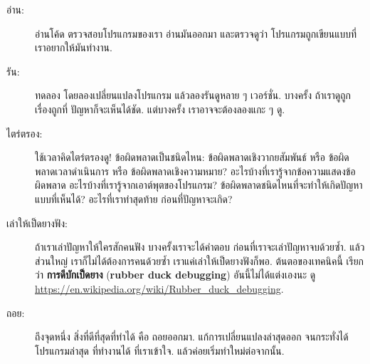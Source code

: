 \begin{description}


\item[อ่าน:] อ่านโค้ด ตรวจสอบโปรแกรมของเรา อ่านมันออกมา
และตรวจดูว่า โปรแกรมถูกเขียนแบบที่เราอยากให้มันทำงาน.


\item[รัน:]
ทดลอง โดยลองเปลี่ยนแปลงโปรแกรม แล้วลองรันดูหลาย ๆ เวอร์ชั่น.
บางครั้ง ถ้าเราดูถูกเรื่องถูกที่ ปัญหาก็จะเห็นได้ชัด.
แต่บางครั้ง เราอาจจะต้องลองแกะ ๆ ดู.


\item[ไตร่ตรอง:] ใช้เวลาคิดไตร่ตรองดู! ข้อผิดพลาดเป็นชนิดไหน: ข้อผิดพลาดเชิงวากยสัมพันธ์
หรือ ข้อผิดพลาดเวลาดำเนินการ
หรือ ข้อผิดพลาดเชิงความหมาย?
อะไรบ้างที่เรารู้จากข้อความแสดงข้อผิดพลาด
อะไรบ้างที่เรารู้จากเอาต์พุตของโปรแกรม?
ข้อผิดพลาดชนิดไหนที่จะทำให้เกิดปัญหาแบบที่เห็นได้?
อะไรที่เราทำสุดท้าย ก่อนที่ปัญหาจะเกิด?



\item[เล่าให้เป็ดยางฟัง:] ถ้าเราเล่าปัญหาให้ใครสักคนฟัง
บางครั้งเราจะได้คำตอบ ก่อนที่เราจะเล่าปัญหาจบด้วยซ้ำ.
แล้วส่วนใหญ่ เราก็ไม่ได้ต้องการคนด้วยซ้ำ
เราแค่เล่าให้เป็ดยางฟังก็พอ.
ต้นตอของเทคนิคนี้ เรียกว่า \textbf{การดีบักเป็ดยาง} (\textbf{rubber duck debugging})
อันนี้ไม่ได้แต่งเองนะ ดู \url{https://en.wikipedia.org/wiki/Rubber_duck_debugging}.


\item[ถอย:] ถึงจุดหนึ่ง สิ่งที่ดีที่สุดที่ทำได้ คือ ถอยออกมา.
แก้การเปลี่ยนแปลงล่าสุดออก จนกระทั่งได้โปรแกรมล่าสุด ที่ทำงานได้ ที่เราเข้าใจ.
แล้วค่อยเริ่มทำใหม่ต่อจากนั้น.

\end{description}

